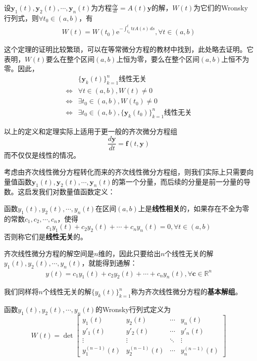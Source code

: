 \begin{theorem}[Liouville公式]
    设$\mathbf{y}_1(t),\mathbf{y}_2(t),\cdots,\mathbf{y}_n(t)$为方程$\frac{d\mathbf{y}}{dt}=A(t)\mathbf{y}$的解，$W(t)$为它们的Wronsky行列式，则$\forall t_0\in (a,b)$，有
    \begin{align*}
        W(t)=W(t_0)\mathrm{e}^{-\int_{t_0}^t \mathrm{tr}A(s)\,ds},\forall t\in(a,b)
    \end{align*}
\end{theorem}

这个定理的证明比较繁琐，可以在\cite{ode}等常微分方程的教材中找到，此处略去证明。它表明，$W(t)$要么在整个区间$(a,b)$上恒为零，要么在整个区间$(a,b)$上恒不为零。因此，\begin{align*}
    &\{\mathbf{y}_k(t)\}_{k=1}^n\text{线性无关}\\
    \iff& \forall t\in(a,b),W(t)\neq 0\\
    \iff& \exists t_0\in(a,b),W(t_0)\neq 0\\
    \iff& \exists t_0\in(a,b),\{\mathbf{y}_k(t_0)\}_{k=1}^n\text{线性无关}
\end{align*}

以上的定义和定理实际上适用于更一般的齐次微分方程组
$$\frac{d\mathbf{y}}{dt}=\mathbf{f}(t,\mathbf{y})$$
而不仅仅是线性的情况。

考虑由齐次线性微分方程转化而来的齐次线性微分方程组，则我们实际上只需要向量值函数$\mathbf{y}_1(t),\mathbf{y}_2(t),\cdots,\mathbf{y}_n(t)$的第一个分量，而后续的分量是前一分量的导数。这启发我们对数量值函数定义：
\begin{definition}
    函数$y_1(t),y_2(t),\cdots,y_n(t)$在区间$(a,b)$上是\textbf{线性相关}的，如果存在不全为零的常数$c_1,c_2,\cdots,c_n$，使得
    \[c_1y_1(t)+c_2y_2(t)+\cdots+c_ny_n(t)=0,\forall t\in(a,b)\]
    否则称它们是\textbf{线性无关}的。
\end{definition}

齐次线性微分方程的解空间是$n$维的，因此只要给出$n$个线性无关的解$y_1(t),y_2(t),\cdots,y_n(t)$，就能得到通解：\begin{align*}
    y(t)=c_1y_1(t)+c_2y_2(t)+\cdots+c_ny_n(t),\forall \mathbf{c}\in\mathbb{R}^n
\end{align*}

我们同样将$n$个线性无关的解$\{y_k(t)\}_{k=1}^n$称为齐次线性微分方程的\textbf{基本解组}。

\begin{definition}[Wronsky行列式]
    函数$y_1(t),y_2(t),\cdots,y_n(t)$的Wronsky行列式定义为
    \[W(t)=\det\begin{bmatrix}
    y_1(t) & y_2(t) & \cdots & y_n(t)\\
    y'_1(t) & y'_2(t) & \cdots & y'_n(t)\\
    \vdots & \vdots & \ddots & \vdots\\
    y_1^{(n-1)}(t) & y_2^{(n-1)}(t) & \cdots & y_n^{(n-1)}(t)
    \end{bmatrix}\]
\end{definition}

